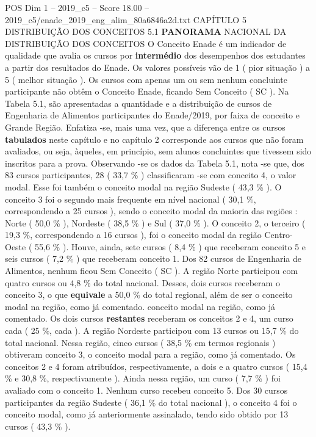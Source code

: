 \begin{textsample}{POS Dim 1 – 2019\_c5 – Score 18.00 – 2019\_c5/enade\_2019\_eng\_alim\_80a6846a2d.txt}  \label{ex:f1_pos_044}
CAPÍTULO 5 DISTRIBUIÇÃO DOS CONCEITOS 5.1 \textbf{PANORAMA} NACIONAL DA DISTRIBUIÇÃO DOS CONCEITOS O Conceito Enade é um indicador de qualidade que avalia os cursos por \textbf{intermédio} dos desempenhos dos estudantes a partir dos resultados do Enade.
Os valores possíveis vão de 1 ( pior situação ) a 5 ( melhor situação ).
Os cursos com apenas um ou sem nenhum concluinte participante não obtêm o Conceito Enade, ficando Sem Conceito ( SC ).
Na Tabela 5.1, são apresentadas a quantidade e a distribuição de cursos de Engenharia de Alimentos participantes do Enade/2019, por faixa de conceito e Grande Região.
Enfatiza -se, mais uma vez, que a diferença entre os cursos \textbf{tabulados} neste capítulo e no capítulo 2 corresponde aos cursos que não foram avaliados, ou seja, àqueles, em princípio, sem alunos concluintes que tivessem sido inscritos para a prova.
Observando -se os dados da Tabela 5.1, nota -se que, dos 83 cursos participantes, 28 ( 33,7 \% ) classificaram -se com conceito 4, o valor modal.
Esse foi também o conceito modal na região Sudeste ( 43,3 \% ).
O conceito 3 foi o segundo mais frequente em nível nacional ( 30,1 \%, correspondendo a 25 cursos ), sendo o conceito modal da maioria das regiões : Norte ( 50,0 \% ), Nordeste ( 38,5 \% ) e Sul ( 37,0 \% ).
O conceito 2, o terceiro ( 19,3 \%, correspondendo a 16 cursos ), foi o conceito modal da região Centro-Oeste ( 55,6 \% ).
Houve, ainda, sete cursos ( 8,4 \% ) que receberam conceito 5 e seis cursos ( 7,2 \% ) que receberam conceito 1.
Dos 82 cursos de Engenharia de Alimentos, nenhum ficou Sem Conceito ( SC ).
A região Norte participou com quatro cursos ou 4,8 \% do total nacional.
Desses, dois cursos receberam o conceito 3, o que \textbf{equivale} a 50,0 \% do total regional, além de ser o conceito modal na região, como já comentado. conceito modal na região, como já comentado.
Os dois cursos \textbf{restantes} receberam os conceitos 2 e 4, um curso cada ( 25 \%, cada ).
A região Nordeste participou com 13 cursos ou 15,7 \% do total nacional.
Nessa região, cinco cursos ( 38,5 \% em termos regionais ) obtiveram conceito 3, o conceito modal para a região, como já comentado.
Os conceitos 2 e 4 foram atribuídos, respectivamente, a dois e a quatro cursos ( 15,4 \% e 30,8 \%, respectivamente ).
Ainda nessa região, um curso ( 7,7 \% ) foi avaliado com o conceito 1.
Nenhum curso recebeu conceito 5.
Dos 30 cursos participantes da região Sudeste ( 36,1 \% do total nacional ), o conceito 4 foi o conceito modal, como já anteriormente assinalado, tendo sido obtido por 13 cursos ( 43,3 \% ).

\end{textsample}
